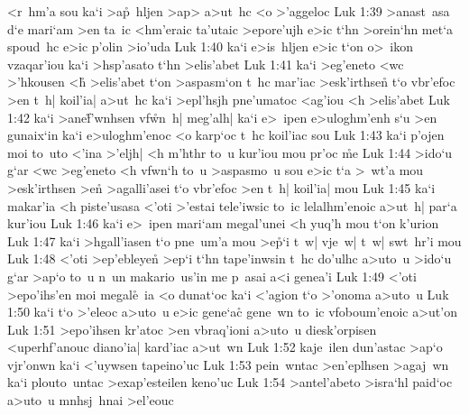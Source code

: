<r~hm'a
sou
ka`i
>a\r{p}~hljen
>ap>
a>ut~hc
<o
>'aggeloc\bibvsend
\vs Luk 1:39
>anast~asa
d`e
mari`am
>en
ta~ic
<hm'eraic
ta'utaic
>epore'ujh
e>ic
t`hn
>orein`hn
met`a
spoud~hc
e>ic
p'olin
>io'uda\bibvsend
\vs Luk 1:40
ka`i
e>is~hljen
e>ic
t`on
o>~ikon
vzaqar'iou
ka`i
>hsp'asato
t`hn
>elis'abet\bibvsend
\vs Luk 1:41
ka`i
>eg'eneto
<wc
>'hkousen
<h\r{}
>elis'abet
t`on
>aspasm`on
t~hc
mar'iac
>esk'irthse\r{n}
t`o
vbr'efoc
>en
t~h|
koil'ia|
a>ut~hc
ka`i
>epl'hsjh
pne'umatoc
<ag'iou
<h
>elis'abet\bibvsend
\vs Luk 1:42
ka`i
>ane\r{f}'wnhsen
vf\r{w}n~h|
meg'alh|
ka`i
e>~ipen
e>uloghm'enh
s`u
>en
gunaix`in
ka`i
e>uloghm'enoc
<o
karp`oc
t~hc
koil'iac
sou\bibvsend
\vs Luk 1:43
ka`i
p'ojen
moi
to~uto
<'ina
>'eljh|
<h
m'hthr
to~u
kur'iou
mou
pr'oc
\r{m}e\bibvsend
{}
\vs Luk 1:44
>ido`u
g`ar
<wc
>eg'eneto
<h
vfwn`h
to~u
>aspasmo~u
sou
e>ic
t`a
>~wt'a
mou
>esk'irthsen
>en\r{}
>agalli'asei
t`o
vbr'efoc
>en
t~h|
koil'ia|
mou\bibvsend
\vs Luk 1:45
ka`i
makar'ia
<h
piste'usasa
<'oti
>'estai
tele'iwsic
to~ic
lelalhm'enoic
a>ut~h|
par`a
kur'iou\bibvsend
\vs Luk 1:46
ka`i
e>~ipen
mari`am
megal'unei
<h
yuq'h
mou
t`on
k'urion\bibvsend
\vs Luk 1:47
ka`i
>hgall'iasen
t`o
pne~um'a
mou
>e\r{p}`i
t~w|
vje~w|
t~w|
swt~hr'i
mou\bibvsend
\vs Luk 1:48
<'oti
>ep'ebleye\r{n}
>ep`i
t`hn
tape'inwsin
t~hc
do'ulhc
a>uto~u
>ido`u
g`ar
>ap`o
to~u
n~un
makario~us'in
me
p~asai
a<i
genea'i\bibvsend
\vs Luk 1:49
<'oti
>epo'ihs'en
moi
megal\r{e}~ia
<o
dunat`oc
ka`i
<'agion
t`o
>'onoma
a>uto~u\bibvsend
\vs Luk 1:50
ka`i
t`o
>'eleoc
a>uto~u
e>ic
gene`ac\r{}
gene~wn
to~ic
vfoboum'enoic
a>ut'on\bibvsend
\vs Luk 1:51
>epo'ihsen
kr'atoc
>en
vbraq'ioni
a>uto~u
diesk'orpisen
<uperhf'anouc
diano'ia|
kard'iac
a>ut~wn\bibvsend
\vs Luk 1:52
kaje~ilen
dun'astac
>ap`o
vjr'onwn
ka`i
<'uywsen
tapeino'uc\bibvsend
\vs Luk 1:53
pein~wntac
>en'eplhsen
>agaj~wn
ka`i
plouto~untac
>exap'esteilen
keno'uc\bibvsend
\vs Luk 1:54
>antel'abeto
>isra`hl
paid`oc
a>uto~u
mnhsj~hnai
>el'eouc\bibvsend
